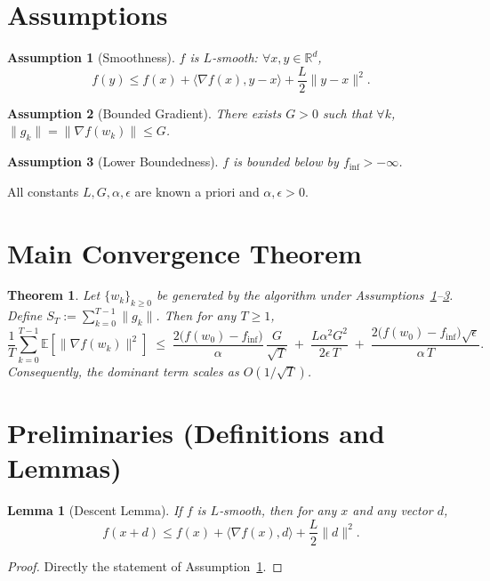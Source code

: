 \documentclass{article}
\newtheorem{theorem}{Theorem}
\newtheorem{lemma}{Lemma}
\newtheorem{assumption}{Assumption}
\newcommand{\E}{\mathbb{E}}
\newcommand{\R}{\mathbb{R}}
\begin{document}
\section*{Assumptions}
\begin{assumption}[Smoothness]\label{ass:smooth}
$f$ is $L$‑smooth: $\forall x,y\in\R^d$,
\[
f(y)\le f(x)+\langle\nabla f(x),y-x\rangle+\frac{L}{2}\|y-x\|^2 .
\]
\end{assumption}
\begin{assumption}[Bounded Gradient]\label{ass:bound}
There exists $G>0$ such that $\forall k$, $\|g_k\|=\|\nabla f(w_k)\|\le G$.
\end{assumption}
\begin{assumption}[Lower Boundedness]\label{ass:lb}
$f$ is bounded below by $f_{\inf}>-\infty$.
\end{assumption}

All constants $L,G,\alpha,\epsilon$ are known a priori and $\alpha,\epsilon>0$.

\section*{Main Convergence Theorem}
\begin{theorem}\label{thm:main}
Let $\{w_k\}_{k\ge0}$ be generated by the algorithm under
Assumptions~\ref{ass:smooth}–\ref{ass:lb}.
Define $S_T:=\sum_{k=0}^{T-1}\|g_k\|$.
Then for any $T\ge 1$,
\[
\frac{1}{T}\sum_{k=0}^{T-1}\E\!\left[\|\nabla f(w_k)\|^2\right]
\;\le\;
\frac{2\bigl(f(w_0)-f_{\inf}\bigr)}{\alpha}\,
\frac{G}{\sqrt{T}}
\;+\;
\frac{L\alpha^{2}G^{2}}{2\epsilon\,T}
\;+\;
\frac{2\bigl(f(w_0)-f_{\inf}\bigr)\sqrt{\epsilon}}{\alpha\,T}.
\tag{1}
\]
Consequently, the dominant term scales as $O(1/\sqrt{T})$.
\end{theorem}

\section*{Preliminaries (Definitions and Lemmas)}
\begin{lemma}[Descent Lemma]\label{lem:descent}
If $f$ is $L$‑smooth, then for any $x$ and any vector $d$,
\[
f(x+d)\le f(x)+\langle\nabla f(x),d\rangle+\frac{L}{2}\|d\|^2 .
\]
\end{lemma}
\begin{proof}
Directly the statement of Assumption~\ref{ass:smooth}. \qedhere
\end{proof}
\end{document}
